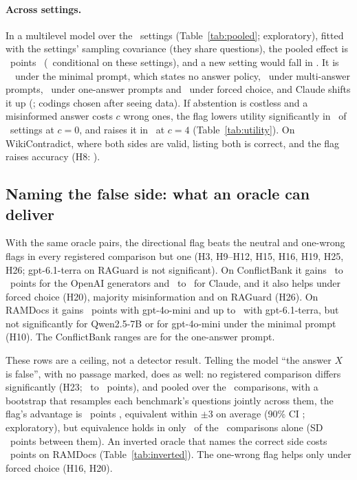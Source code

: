 \paragraph{Across settings.} In a multilevel model over the \neuMlK\ settings (Table~\ref{tab:pooled}; exploratory),
fitted with the settings' sampling covariance (they share questions), the pooled effect is \neuMlMu\ points
\neuMlCI\ (\neuMlCIDesign\ conditional on these settings), and a new setting would fall in \neuMlPI. It is
\neuPolMinimal\ \neuPolMinimalCI\ under the minimal prompt, which states no answer policy, \neuPolMulti\ under
multi-answer prompts, \neuPolSingle\ under one-answer prompts and \neuPolForced\ under forced choice, and Claude
shifts it up (\neuMlAnthropic; codings chosen after seeing data). If abstention is costless and a misinformed answer
costs $c$ wrong ones, the flag lowers utility significantly in \nUtilSixNegZero\ of \nUtilSixSettings\ settings at
$c=0$, and raises it in \nUtilSixPosFour\ at $c=4$ (Table~\ref{tab:utility}). On WikiContradict, where both sides are valid, listing both is
correct, and the flag raises accuracy (H8: \wikiOracleFlag).

\subsection{Naming the false side: what an oracle can deliver}
\label{sec:direction}
With the same oracle pairs, the directional flag beats the neutral and one-wrong flags in every registered comparison
but one (H3, H9--H12, H15, H16, H19, H25, H26; gpt-6.1-terra on RAGuard is not significant). On ConflictBank it gains
\azSgTerraOracleFlagDirectionalConflict\ to \azSgLunaOracleFlagDirectionalConflict\ points for the OpenAI generators
and \azSgSonnetOracleFlagDirectionalConflict\ to \azSgHaikuOracleFlagDirectionalConflict\ for Claude, and it also
helps under forced choice (H20), majority misinformation and on RAGuard (H26). On RAMDocs it gains \adOracleDirConf\ points with gpt-4o-mini and
up to \azRdTerraOracleFlagDirectionalConflict\ with gpt-6.1-terra, but not significantly for Qwen2.5-7B or for
gpt-4o-mini under the minimal prompt (H10). The ConflictBank ranges are for the one-answer prompt.

These rows are a ceiling, not a detector result. Telling the model ``the answer $X$ is false'', with no passage
marked, does as well: no registered comparison differs significantly (H23; \keyDiffMin\ to \keyDiffMax\ points), and
pooled over the \PoolTwentyThreeK\ comparisons, with a bootstrap that resamples each benchmark's questions jointly
across them, the flag's advantage is \PoolTwentyThree\ points \PoolTwentyThreeCI, equivalent within $\pm$3 on average
(90\% CI \PoolTwentyThreeCINinety; exploratory), but equivalence holds in only \hTwentyThreeEqN\ of the
\hTwentyThreeK\ comparisons alone (SD \hTwentyThreeTau\ points between them). An inverted oracle
that names the correct side costs \aadvDirConf\ points on RAMDocs (Table~\ref{tab:inverted}). The one-wrong flag helps only under forced choice (H16, H20).


